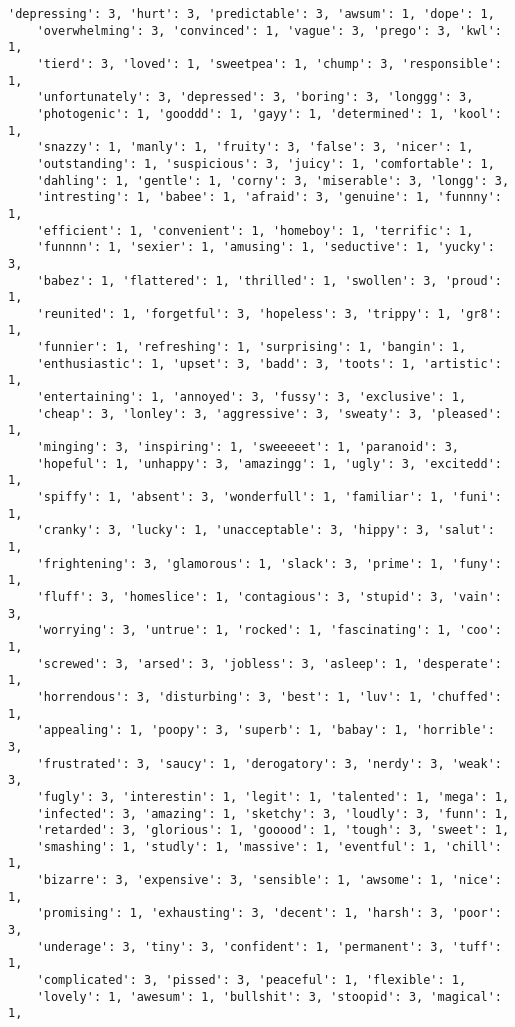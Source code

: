 \begin{lstlisting}[caption={\textit{sentiment\_words.py}: sentiment words}]
    'depressing': 3, 'hurt': 3, 'predictable': 3, 'awsum': 1, 'dope': 1,
    'overwhelming': 3, 'convinced': 1, 'vague': 3, 'prego': 3, 'kwl': 1,
    'tierd': 3, 'loved': 1, 'sweetpea': 1, 'chump': 3, 'responsible': 1,
    'unfortunately': 3, 'depressed': 3, 'boring': 3, 'longgg': 3,
    'photogenic': 1, 'gooddd': 1, 'gayy': 1, 'determined': 1, 'kool': 1,
    'snazzy': 1, 'manly': 1, 'fruity': 3, 'false': 3, 'nicer': 1,
    'outstanding': 1, 'suspicious': 3, 'juicy': 1, 'comfortable': 1,
    'dahling': 1, 'gentle': 1, 'corny': 3, 'miserable': 3, 'longg': 3,
    'intresting': 1, 'babee': 1, 'afraid': 3, 'genuine': 1, 'funnny': 1,
    'efficient': 1, 'convenient': 1, 'homeboy': 1, 'terrific': 1,
    'funnnn': 1, 'sexier': 1, 'amusing': 1, 'seductive': 1, 'yucky': 3,
    'babez': 1, 'flattered': 1, 'thrilled': 1, 'swollen': 3, 'proud': 1,
    'reunited': 1, 'forgetful': 3, 'hopeless': 3, 'trippy': 1, 'gr8': 1,
    'funnier': 1, 'refreshing': 1, 'surprising': 1, 'bangin': 1,
    'enthusiastic': 1, 'upset': 3, 'badd': 3, 'toots': 1, 'artistic': 1,
    'entertaining': 1, 'annoyed': 3, 'fussy': 3, 'exclusive': 1,
    'cheap': 3, 'lonley': 3, 'aggressive': 3, 'sweaty': 3, 'pleased': 1,
    'minging': 3, 'inspiring': 1, 'sweeeeet': 1, 'paranoid': 3,
    'hopeful': 1, 'unhappy': 3, 'amazingg': 1, 'ugly': 3, 'excitedd': 1,
    'spiffy': 1, 'absent': 3, 'wonderfull': 1, 'familiar': 1, 'funi': 1,
    'cranky': 3, 'lucky': 1, 'unacceptable': 3, 'hippy': 3, 'salut': 1,
    'frightening': 3, 'glamorous': 1, 'slack': 3, 'prime': 1, 'funy': 1,
    'fluff': 3, 'homeslice': 1, 'contagious': 3, 'stupid': 3, 'vain': 3,
    'worrying': 3, 'untrue': 1, 'rocked': 1, 'fascinating': 1, 'coo': 1,
    'screwed': 3, 'arsed': 3, 'jobless': 3, 'asleep': 1, 'desperate': 1,
    'horrendous': 3, 'disturbing': 3, 'best': 1, 'luv': 1, 'chuffed': 1,
    'appealing': 1, 'poopy': 3, 'superb': 1, 'babay': 1, 'horrible': 3,
    'frustrated': 3, 'saucy': 1, 'derogatory': 3, 'nerdy': 3, 'weak': 3,
    'fugly': 3, 'interestin': 1, 'legit': 1, 'talented': 1, 'mega': 1,
    'infected': 3, 'amazing': 1, 'sketchy': 3, 'loudly': 3, 'funn': 1,
    'retarded': 3, 'glorious': 1, 'gooood': 1, 'tough': 3, 'sweet': 1,
    'smashing': 1, 'studly': 1, 'massive': 1, 'eventful': 1, 'chill': 1,
    'bizarre': 3, 'expensive': 3, 'sensible': 1, 'awsome': 1, 'nice': 1,
    'promising': 1, 'exhausting': 3, 'decent': 1, 'harsh': 3, 'poor': 3,
    'underage': 3, 'tiny': 3, 'confident': 1, 'permanent': 3, 'tuff': 1,
    'complicated': 3, 'pissed': 3, 'peaceful': 1, 'flexible': 1,
    'lovely': 1, 'awesum': 1, 'bullshit': 3, 'stoopid': 3, 'magical': 1,

\end{lstlisting}
